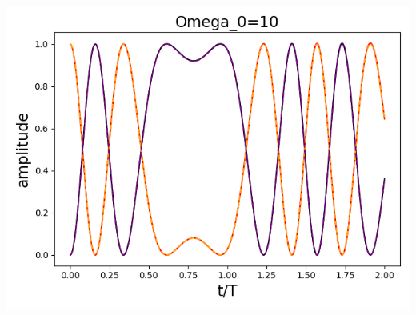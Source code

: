 \documentclass[11pt, oneside]{book}
\theoremstyle{break}
\theoremstyle{break}
\begin{document}
\begin{center}
\includegraphics[scale=0.39]{542HW1/b10}\\
\end{center}
\end{document}
